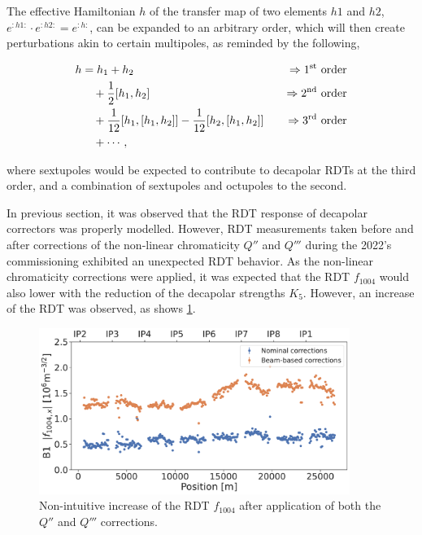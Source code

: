 The effective Hamiltonian $h$ of the transfer map of two elements $h1$ and $h2$, $e^{:h1:} \cdot
e^{:h2:} = e^{:h:}$, can be expanded to an arbitrary order, which will then create perturbations
akin to certain multipoles, as reminded by the following,

\begin{equation}
    \begin{aligned}
        h &= h_1 + h_2 \quad &\Rightarrow \text{1\textsuperscript{st} order} \\
        &\quad + \frac{1}{2} [h_1, h_2] \quad &\Rightarrow \text{2\textsuperscript{nd} order} \\
        &\quad + \frac{1}{12} [h_1, [h_1, h_2]] - \frac{1}{12} [h_2, [h_1, h_2]] \quad &\Rightarrow \text{3\textsuperscript{rd} order} \\
        &\quad + \cdots,
    \end{aligned}
    \nonumber
\end{equation}

where sextupoles would be expected to contribute to decapolar RDTs at the third order, and a
combination of sextupoles and octupoles to the second.

In previous section, it was observed that the RDT response of decapolar correctors was properly
modelled. However, RDT measurements taken before and after corrections of the non-linear
chromaticity $Q''$ and $Q'''$ during the 2022's commissioning exhibited an unexpected RDT behavior.
As the non-linear chromaticity corrections were applied, it was expected that the RDT $f_{1004}$
would also lower with the reduction of the decapolar strengths $K_5$. However, an increase of the
RDT was observed, as shows \cref{fig:decapoles:f1004_dq2_dq3}.

\begin{figure}[!htb]
    \centering
    \includegraphics[width=0.9\textwidth]{./images/f1004_dq2_dq3_2022.pdf}    
    \caption{Non-intuitive increase of the RDT $f_{1004}$ after application of both the $Q''$ and
    $Q'''$ corrections.}
    \label{fig:decapoles:f1004_dq2_dq3}
\end{figure}


